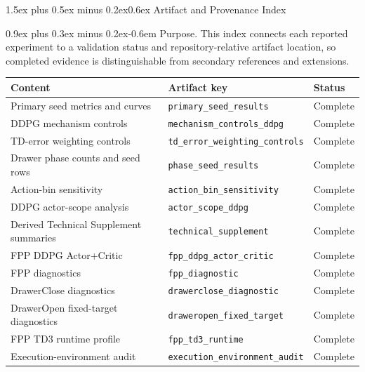 \documentclass[10pt,letterpaper]{article}
\makeatletter
\renewcommand\section{\@startsection{section}{1}{0pt}%
  {1.5ex plus 0.5ex minus 0.2ex}{0.6ex}%
  {\normalfont\large\bfseries}}
\renewcommand\paragraph{\@startsection{paragraph}{4}{0pt}%
  {0.9ex plus 0.3ex minus 0.2ex}{-0.6em}%
  {\normalfont\normalsize\bfseries}}
\renewenvironment{table*}[1][tbp]
  {\begin{table}[!htbp]}
  {\end{table}}
\makeatother
\begin{document}
\FloatBarrier
\section{Artifact and Provenance Index}

\paragraph{Purpose.}
This index connects each reported experiment to a validation status and
repository-relative artifact location, so completed evidence is distinguishable
from secondary references and extensions.

\begin{table}[t]
\centering
\small
\setlength{\tabcolsep}{5pt}
\begin{tabular}{>{\raggedright\arraybackslash}p{}
                >{\raggedright\arraybackslash}p{}
                >{\raggedright\arraybackslash}p{}}
\toprule
Content & Artifact key & Status \\
\midrule
Primary seed metrics and curves &
\texttt{primary\_seed\_results} & Complete \\
DDPG mechanism controls &
\texttt{mechanism\_controls\_ddpg} & Complete \\
TD-error weighting controls &
\texttt{td\_error\_weighting\_controls} & Complete \\
Drawer phase counts and seed rows &
\texttt{phase\_seed\_results} & Complete \\
Action-bin sensitivity &
\texttt{action\_bin\_sensitivity} & Complete \\
DDPG actor-scope analysis &
\texttt{actor\_scope\_ddpg} & Complete \\
Derived Technical Supplement summaries &
\texttt{technical\_supplement} & Complete \\
FPP DDPG Actor+Critic &
\texttt{fpp\_ddpg\_actor\_critic} & Complete \\
FPP diagnostics &
\texttt{fpp\_diagnostic} & Complete \\
DrawerClose diagnostics &
\texttt{drawerclose\_diagnostic} & Complete \\
DrawerOpen fixed-target diagnostics &
\texttt{draweropen\_fixed\_target} & Complete \\
FPP TD3 runtime profile &
\texttt{fpp\_td3\_runtime} & Complete \\
Execution-environment audit &
\texttt{execution\_environment\_audit} & Complete \\

\end{tabular}
\end{table}
\end{document}
